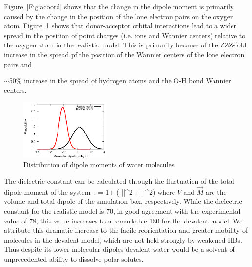 \documentclass[aps,prl,reprint,amsmath,amssymb]{revtex4-1}
\begin{document}
Figure~\ref{Fig:acoord} shows that the change in the dipole moment is primarily caused by the change in the position of the lone electron pairs on the oxygen atom. 
Figure~\ref{Fig:dipoledist} shows that donor-acceptor orbital interactions lead to a wider spread in the position of point charges (i.e. ions and Wannier centers) relative to the oxygen atom in the realistic model. 
This is primarily because of the ZZZ-fold increase in the spread pf the position of the Wannier centers of the lone electron pairs and  


$\sim$50\% increase in the spread of hydrogen atoms and the O-H bond Wannier centers.

\begin{figure}
\includegraphics[width=0.4\textwidth]{new_dipole}
\caption{Distribution of dipole moments of water molecules.} \label{Fig:dipoledist}

\end{figure}

The dielectric constant can be calculated through the fluctuation of the total dipole moment of the system~\cite{neumann1983dipole,adams1981theory}:
%
\bea
\epsilon = 1+  (  \langle ||^2 \rangle  - \langle || \rangle ^2) \label{Eq:dielectric}
\eea
%
where $V$ and $\vec{M}$ are the volume and total dipole of the simulation box, respectively. 
While the dielectric constant for the realistic model is 70, in good agreement with the experimental value of 78, this value increases to a remarkable 180 for the devalent model.
We attribute this dramatic increase to the facile reorientation and greater mobility of molecules in the devalent model, which are not held strongly by weakened HBs. 
Thus despite its lower molecular dipoles devalent water would be a solvent of unprecedented ability to dissolve polar solutes.
\end{document}
